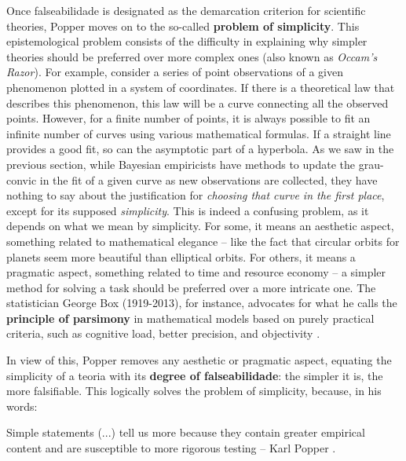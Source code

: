 \documentclass[./main_en.tex]{subfiles}
\begin{document}
\par Once \gls{falseabilidade} is designated as the demarcation criterion for scientific theories, Popper moves on to the so-called \textbf{problem of simplicity}. This epistemological problem consists of the difficulty in explaining why simpler theories should be preferred over more complex ones (also known as \textit{Occam's Razor}). For example, consider a series of point observations of a given phenomenon plotted in a \gls{system} of coordinates. If there is a theoretical law that describes this phenomenon, this law will be a curve connecting all the observed points. However, for a finite number of points, it is always possible to fit an infinite number of curves using various mathematical formulas. If a straight line provides a good fit, so can the asymptotic part of a hyperbola. As we saw in the previous section, while Bayesian empiricists have methods to update the \gls{grau-convic} in the fit of a given curve as new observations are collected, they have nothing to say about the justification for \textit{choosing that curve in the first place}, except for its supposed \textit{simplicity}. This is indeed a confusing problem, as it depends on what we mean by simplicity. For some, it means an aesthetic aspect, something related to mathematical elegance – like the fact that circular orbits for planets seem more beautiful than elliptical orbits. For others, it means a pragmatic aspect, something related to time and resource economy – a simpler method for solving a task should be preferred over a more intricate one. The statistician George Box (1919-2013), for instance, advocates for what he calls the \textbf{principle of parsimony} in mathematical models based on purely practical criteria, such as cognitive load, better precision, and objectivity \cite{Box1979}.

\par In view of this, Popper removes any aesthetic or pragmatic aspect, equating the simplicity of a \gls{teoria} with its \textbf{degree of \gls{falseabilidade}}: the simpler it is, the more falsifiable. This logically solves the problem of simplicity, because, in his words:

\begin{adjustwidth}{100pt}{0pt}
\medskip
\small Simple statements (...) tell us more because they contain greater empirical content and are susceptible to more rigorous testing -- Karl Popper \cite{popper2004logica}.
\medskip
\end{adjustwidth}
\end{document}
